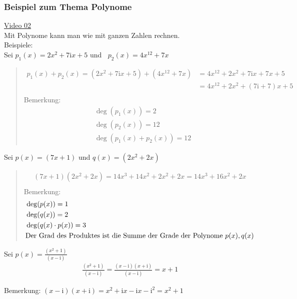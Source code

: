 \subsubsection{Beispiel zum Thema Polynome}
\href{https://youtu.be/cbCiEF4aO6E}{Video 02}\\
Mit Polynome kann man wie mit ganzen Zahlen  rechnen.\\
\newpage
\noindent
Beispiele:\\
\textbullet\;\;Sei $ p_1(x) =2x^2+7\mathrm{i}x+5$ und $\;\; p_2(x)=4x^{12}+7x$\\
\begin{quote}


\begin{align*}
p_1(x)+p_2(x)=(2x^2+7\mathrm{i}x+5)+(4x^{12}+7x)&=4x^{12}+2x^2+7\mathrm{i}x+7x+5\\&=4x^{12}+2x^2+(7\mathrm{i}+7)x+5\\
\end{align*}
Bemerkung: \\
\begin{align*}
&\deg(p_1(x))=2\\
&\deg(p_2(x))=12\\
&\deg(p_1(x)+p_2(x))=12
\end{align*}
\end{quote}
\textbullet \;\; Sei $ p(x)=(7x+1) $ und $ q(x)=(2x^2+2x) $\\
\begin{quote}
	\begin{align*}
	(7x+1)(2x^2+2x)=14x^3+14x^2+2x^2+2x=14x^3+16x^2+2x\\
	\end{align*}
	Bemerkung:\\
	\begin{align*}
&	\deg(p(x))=1\\
&\deg(q(x))=2\\
&\deg(q(x)\cdot p(x))=3\\
&\text{Der Grad des Produktes ist die Summe der Grade der Polynome $ p(x), q(x) $}
	\end{align*}
\end{quote}
\textbullet\;\; Sei $ p(x)=\frac{(x^2+1)}{(x-\mathrm{i})} $\\
\begin{align*}
\frac{(x^2+1)}{(x-\mathrm{i})}=\frac{(x-\mathrm{i})(x+\mathrm{i})}{(x-\mathrm{i})}=x+1
\end{align*}
 
 Bemerkung: $ (x-\mathrm{i})(x+\mathrm{i})=x^2+\mathrm{i}x-\mathrm{i}x-\mathrm{i}^2=x^2+1 $\\
